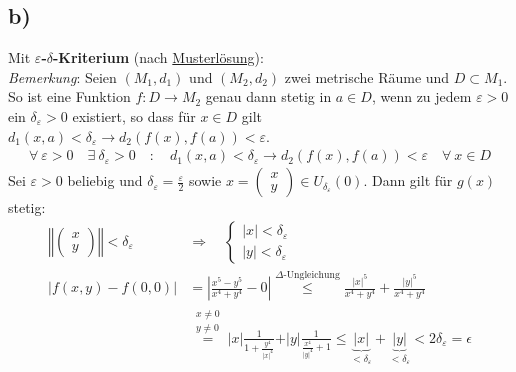 \documentclass[11pt,a4paper]{article}
\newcommand{\1}    	{\mathbbm{1}}
\begin{document}
	\subsection*{b)}
	Mit \textbf{\(\varepsilon\)-\(\delta\)-Kriterium} (nach \underline{Musterlösung}): \\
	\textit{Bemerkung}: Seien \((M_1,d_1)\) und \((M_2,d_2)\) zwei metrische Räume und \(D \subset M_1\). So ist eine Funktion \(f: D \rightarrow M_2\) genau dann stetig in \(a \in D\), wenn zu jedem \(\varepsilon > 0\) ein \(\delta_\varepsilon > 0\) existiert, so dass für \(x \in D\) gilt \(d_1(x,a) < \delta_\varepsilon \rightarrow d_2(f(x), f(a)) < \varepsilon\).
	\begin{align*}
		\forall~ \varepsilon > 0 \quad \exists~ \delta_\varepsilon > 0 \quad:\quad d_1(x,a) < \delta_\varepsilon \rightarrow d_2(f(x), f(a)) < \varepsilon \quad \forall~ x \in D
	\end{align*}
	Sei \(\varepsilon > 0\) beliebig und \(\delta_\varepsilon = \frac{\varepsilon}{2}\) sowie \(x = \left( \begin{array}{c} x \\ y \end{array} \right) \in U_{\delta_\varepsilon}( 0 )\). Dann gilt für \(g(x)\) stetig:
	\begin{align*}
		\left\Vert \left( \begin{array}{c} x \\ y \end{array}\right)\right\Vert < \delta_\varepsilon
		\quad&\Rightarrow\quad \left\{ \begin{array}{c}
			\vert x \vert < \delta_\varepsilon \\
			\vert y \vert < \delta_\varepsilon
		\end{array} \right. \\
		\left\vert f(x,y) - f(0,0) \right\vert &= 
		\left\vert \frac{x^5 - y^5}{x^4 + y^4} - 0 \right\vert \stackrel{\Delta\textrm{-Ungleichung}}{\leqslant} \frac{\vert x \vert ^5}{x^4 + y^4} + \frac{\vert y \vert ^5}{x^4 + y^4} \\
		&\stackrel{\substack{x \neq 0 \\ y \neq 0}}{=} \vert x \vert \frac{1}{1 + \frac{y^4}{\vert x \vert^4}} + \vert y \vert \frac{1}{\frac{x^4}{\vert y \vert^4} + 1} \leqslant \underbrace{\vert x \vert}_{< \delta_\varepsilon} +  \underbrace{\vert y \vert}_{< \delta_\varepsilon} < 2 \delta_\varepsilon = \epsilon
	\end{align*}
	
\end{document}
